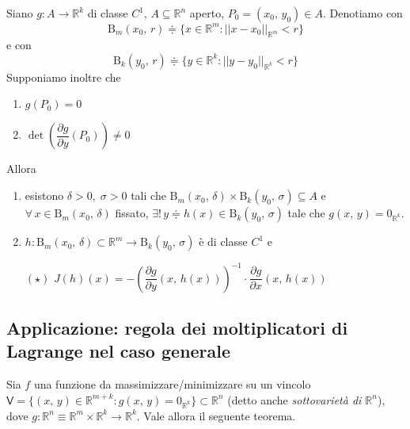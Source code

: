 \begin{thm}
Siano $g : A \longrightarrow \mathbb{R}^k$ di classe $C^1$, $A \subseteq \mathbb{R}^n$ aperto, $P_0 = (x_0,\,y_0) \in A$. Denotiamo con
$$
\mathrm{B}_m(x_0,\,r) \doteqdot \lbrace x \in \mathbb{R}^m : ||x-x_0||_{\mathbb{R}^m} < r \rbrace
$$
e con
$$
\mathrm{B}_k(y_0,\,r) \doteqdot \lbrace y \in \mathbb{R}^k : ||y-y_0||_{\mathbb{R}^k} < r \rbrace
$$
Supponiamo inoltre che
\begin{enumerate}[labelindent=\parindent,leftmargin=*,label=\textnormal{(\roman*)},start=1]
\item $g(P_0) = 0$
\item $\det \left( \dfrac{\partial g}{\partial y}(P_0) \right) \neq 0$
\end{enumerate}
Allora
\begin{enumerate}[labelindent=\parindent,leftmargin=*,label=\textnormal{(D\arabic*)},start=1]
\item esistono $\delta > 0,\; \sigma > 0$ tali che $\mathrm{B}_m(x_0,\,\delta) \times \mathrm{B}_k(y_0,\,\sigma) \subseteq A$ e $\forall \, x \in \mathrm{B}_m(x_0,\,\delta)$ fissato, $\exists ! \, y \doteqdot h(x) \in \mathrm{B}_k(y_0,\,\sigma)$ tale che $g(x,\,y) = 0_{\mathbb{R}^k}$.

\item $h : \mathrm{B}_m(x_0,\,\delta) \subset \mathbb{R}^m \longrightarrow \mathrm{B}_k(y_0,\,\sigma)$ è di classe $C^1$ e
\begin{center}
$\mathrm{(\star)}$
\hfill
$\displaystyle
J(h)(x) = -
\left( \dfrac{\partial g}{\partial y}(x,\,h(x)) \right)^{-1}
\cdot
\dfrac{\partial g}{\partial x}(x,\,h(x))
$
\hfill \null \\
\end{center}
\end{enumerate}
\begin{center}
\def\svgwidth{10cm}

\end{center}
\end{thm}

\subsection{Applicazione: regola dei moltiplicatori di Lagrange nel caso generale}
Sia $f$ una funzione da massimizzare/minimizzare su un vincolo $\mathsf{V} = \lbrace (x,\,y) \in \mathbb{R}^{m+k} : g(x,\,y) = 0_{\mathbb{R}^k} \rbrace \subset \mathbb{R}^n$ (detto anche \emph{sottovarietà di $\mathbb{R}^n$}), dove $g : \mathbb{R}^n \equiv \mathbb{R}^m \times \mathbb{R}^k \longrightarrow \mathbb{R}^k$. Vale allora il seguente teorema.

